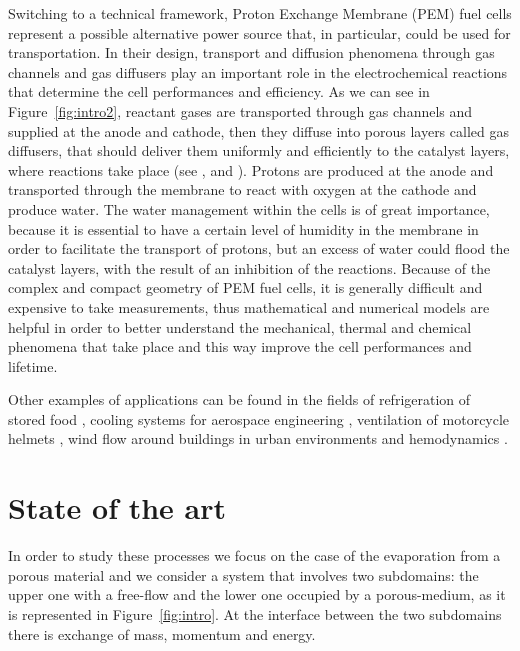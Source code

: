 Switching to a technical framework, Proton Exchange Membrane (PEM) fuel cells 
represent a possible alternative power source that, in particular, could be 
used for transportation. In their design, transport and diffusion phenomena 
through gas channels and gas diffusers play an important role in the 
electrochemical reactions that determine the cell performances and efficiency. 
As we can see in Figure~\ref{fig:intro2}, reactant gases are transported 
through gas channels and supplied at the anode and cathode, then they diffuse 
into porous layers called gas diffusers, that should deliver them uniformly and 
efficiently to the catalyst layers, where reactions take place (see 
\cite{wu:fuelcell}, \cite{tesi:baber} and \cite{tesi:pem}). Protons are 
produced at the anode and transported through the membrane to react with oxygen 
at the cathode and produce water. The water management within the cells is of 
great importance, because it is essential to have a certain level of humidity in 
the membrane in order to facilitate the transport of protons, but an excess of 
water could flood the catalyst layers, with the result of an inhibition of the 
reactions.
Because of the complex and compact geometry of PEM fuel cells, it is generally 
difficult and expensive to take measurements, thus mathematical and numerical 
models are helpful in order to better understand the mechanical, thermal and 
chemical phenomena that take place and this way improve the cell performances 
and lifetime.

Other examples of applications can be found in the fields of refrigeration of 
stored food \cite{intro:food}, cooling systems for aerospace engineering 
\cite{intro:aero}, ventilation of motorcycle helmets \cite{intro:discacim}, 
wind flow around buildings in urban environments \cite{intro:buildings} and 
hemodynamics \cite{intro:med}.

\section{State of the art}
In order to study these processes we focus on
the case of the evaporation from a porous material and we consider
a system that 
involves two subdomains: the upper one with a free-flow and the lower one 
occupied by a porous-medium, as it is represented in Figure~\ref{fig:intro}.
At the interface between the two subdomains there is exchange of mass, momentum 
and energy.

